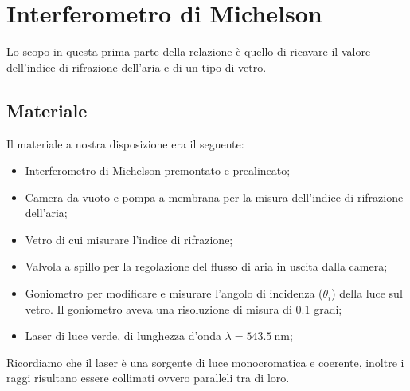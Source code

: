 \section{Interferometro di Michelson}

Lo scopo in questa prima parte della relazione è quello di ricavare il valore dell'indice di rifrazione dell'aria e di un tipo di vetro.

\subsection{Materiale}

Il materiale a nostra disposizione era il seguente:
\begin{itemize}
	\item{Interferometro di Michelson premontato e prealineato;}
    \item{Camera da vuoto e pompa a membrana per la misura dell'indice di rifrazione dell'aria;}
    \item{Vetro di cui misurare l'indice di rifrazione;}
	\item{Valvola a spillo per la regolazione del flusso di aria in uscita dalla camera;}
	\item{Goniometro per modificare e misurare l'angolo di incidenza ($\theta_i$) della luce sul vetro. Il goniometro aveva una risoluzione di misura di 0.1 gradi;}
    \item{Laser di luce verde, di lunghezza d'onda $\lambda = \SI{543.5}{\nano\metre}$;}
\end{itemize}
Ricordiamo che il laser è una sorgente di luce monocromatica e coerente, inoltre i raggi risultano essere collimati ovvero paralleli tra di loro.


